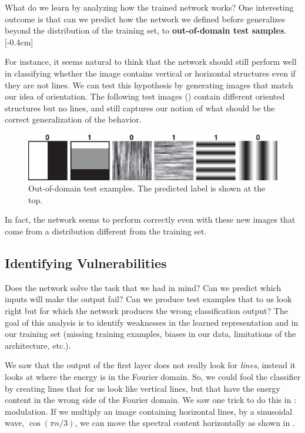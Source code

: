 What do we learn by analyzing how the trained network works? One interesting outcome is that can we predict how the network we defined before generalizes beyond the distribution of the training set, to {\bf out-of-domain test samples}. 
[-0.4cm]

For instance, it seems natural to think that the network should still perform well in classifying whether the image contains vertical or horizontal structures even if they are not lines. We can test this hypothesis by generating images that match our idea of orientation. The following test images (\fig{\ref{fig:ref:convolutional_neural_nets:oriented_bars_cnn_generalization}}) contain different oriented structures but no lines, and still captures our notion of what should be the correct generalization of the behavior. 

\begin{figure}
\includegraphics[width=1\linewidth]{./figures/convolutional_neural_nets/oriented_bars_cnn_generalization.eps}
\caption{Out-of-domain test examples. The predicted label is shown at the top.}
\label{fig:ref:convolutional_neural_nets:oriented_bars_cnn_generalization}
\end{figure}

In fact, the network seems to perform correctly even with these new images that come from a distribution different from the training set. 

\subsection{Identifying Vulnerabilities}

Does the network solve the task that we had in mind? Can we predict which inputs will make the output fail? Can we produce test examples that to us look right but for which the network produces the wrong classification output? The goal of this analysis is to identify weaknesses in the learned representation and in our training set (missing training examples, biases in our data, limitations of the architecture, etc.).

We saw that the output of the first layer does not really look for {\em lines}, instead it looks at where the energy is in the Fourier domain. So, we could fool the classifier by creating lines that for us look like vertical lines, but that have the energy content in the wrong side of the Fourier domain. We saw one trick to do this in \chap{\ref{chapter:fourier_analysis}}: modulation. If we multiply an image containing horizontal lines, by a sinusoidal wave, $\cos (\pi n / 3)$, we can move the spectral content horizontally as shown in \fig{\ref{fig:convolutional_neural_nets:oriented_bars_cnn_test_adversarial_creation1}}.


